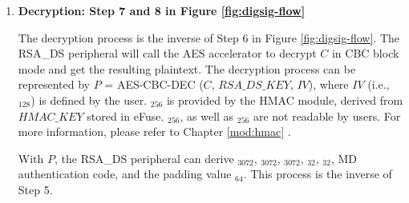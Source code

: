 \documentclass[main\_\_EN.tex]{subfiles}
\begin{document}
\begin{enumerate}

    \item {\bfseries Decryption: Step 7 and 8 in Figure \ref{fig:digsig-flow}}


        The decryption process is the inverse of Step 6 in Figure \ref{fig:digsig-flow}. The RSA\_DS peripheral will call the AES accelerator to decrypt \begin{math}C\end{math} in CBC block mode and get the resulting plaintext. The decryption process can be represented by \begin{math}P\end{math} = AES-CBC-DEC (\begin{math}C\end{math}, \begin{math}RSA\_DS\_KEY\end{math}, \begin{math}IV\end{math}), where \begin{math}IV\end{math} (i.e., \begin{math}[IV]_{128}\end{math}) is defined by the user. \begin{math}[RSA\_DS\_KEY]_{256}\end{math} is provided by the HMAC module, derived from \begin{math}HMAC\_KEY\end{math} stored in eFuse. \begin{math}[RSA\_DS\_KEY]_{256}\end{math}, as well as \begin{math}[HMAC\_KEY]_{256}\end{math} are not readable by users. For more information, please refer to Chapter \ref{mod:hmac} \textit{}.

        With \begin{math}P\end{math}, the RSA\_DS peripheral can derive \begin{math}[Y]_{3072}\end{math}, \begin{math}[M]_{3072}\end{math}, \begin{math}[\overline{r}]_{3072}\end{math}, \begin{math}[M^{\prime}]_{32}\end{math}, \begin{math}[L]_{32}\end{math}, MD authentication code, and the padding value \begin{math}[\beta]_{64} \end{math}. This process is the inverse of Step 5.


\end{enumerate}
\end{document}
